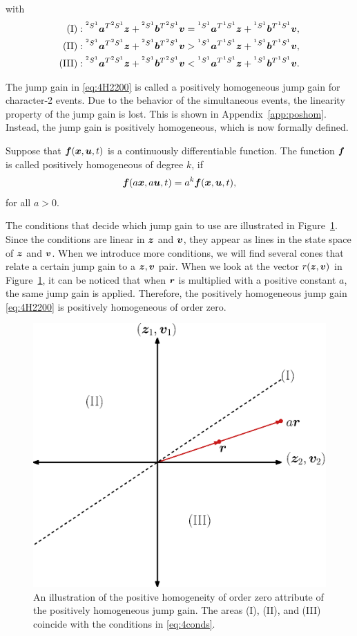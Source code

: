 \documentclass[../DC2017114Bouma.tex]{subfiles}
\begin{document}
with
\begin{align}
(\text{I})&:\hspace{0cm}^{^2 S^1}{\boldsymbol{a}}^T\hspace{0cm}^{^2 S^1}{\boldsymbol{z}} +\hspace{0cm}^{^2 S^1}{\boldsymbol{b}}^T\hspace{0cm}^{^2 S^1}{\boldsymbol{v}} = \hspace{0cm}^{^1 S^1}{\boldsymbol{a}}^T\hspace{0cm}^{^1 S^1}{\boldsymbol{z}} +\hspace{0cm}^{^1 S^1}{\boldsymbol{b}}^T\hspace{0cm}^{^1 S^1}{\boldsymbol{v}},\nonumber\\
(\text{II})&:\hspace{0cm}^{^2 S^1}{\boldsymbol{a}}^T\hspace{0cm}^{^2 S^1}{\boldsymbol{z}} +\hspace{0cm}^{^2 S^1}{\boldsymbol{b}}^T\hspace{0cm}^{^2 S^1}{\boldsymbol{v}} > \hspace{0cm}^{^1 S^1}{\boldsymbol{a}}^T\hspace{0cm}^{^1 S^1}{\boldsymbol{z}} +\hspace{0cm}^{^1 S^1}{\boldsymbol{b}}^T\hspace{0cm}^{^1 S^1}{\boldsymbol{v}},\label{eq:4conds}\\
(\text{III})&:\hspace{0cm}^{^2 S^1}{\boldsymbol{a}}^T\hspace{0cm}^{^2 S^1}{\boldsymbol{z}} +\hspace{0cm}^{^2 S^1}{\boldsymbol{b}}^T\hspace{0cm}^{^2 S^1}{\boldsymbol{v}} < \hspace{0cm}^{^1 S^1}{\boldsymbol{a}}^T\hspace{0cm}^{^1 S^1}{\boldsymbol{z}} +\hspace{0cm}^{^1 S^1}{\boldsymbol{b}}^T\hspace{0cm}^{^1 S^1}{\boldsymbol{v}}.\nonumber
\end{align}

The jump gain in \eqref{eq:4H2200} is called a positively homogeneous jump gain for character-2 events. Due to the behavior of the simultaneous events, the linearity property of the jump gain is lost. This is shown in Appendix~\ref{app:poshom}. Instead, the jump gain is positively homogeneous, which is now formally defined.
 
\begin{mydef}
Suppose that ${\boldsymbol{f}}({\boldsymbol{x}},{\boldsymbol{u}},t)$ is a continuously differentiable function. The function ${\boldsymbol{f}}$ is called positively homogeneous of degree $k$, if 
\begin{align}
{\boldsymbol{f}}(a{\boldsymbol{x}},a{\boldsymbol{u}},t) = a^k{\boldsymbol{f}}({\boldsymbol{x}},{\boldsymbol{u}},t),
\end{align}
for all $a>0$.
\end{mydef}

The conditions that decide which jump gain to use are illustrated in Figure~\ref{fig:4cone}. Since the conditions are linear in ${\boldsymbol{z}}$ and ${\boldsymbol{v}}$, they appear as lines in the state space of ${\boldsymbol{z}}$ and ${\boldsymbol{v}}$. When we introduce more conditions, we will find several cones that relate a certain jump gain to a ${\boldsymbol{z}},{\boldsymbol{v}}$ pair. When we look at the vector $r({\boldsymbol{z}},{\boldsymbol{v}})$ in Figure~\ref{fig:4cone}, it can be noticed that when ${\boldsymbol{r}}$ is multiplied with a positive constant $a$, the same jump gain is applied. Therefore, the positively homogeneous jump gain \eqref{eq:4H2200} is positively homogeneous of order zero.

\begin{figure}[H]
\centering
\includegraphics[width=.5\textwidth]{4cone.eps}\caption{An illustration of the positive homogeneity of order zero attribute of the positively homogeneous jump gain. The areas \textnormal{(I)}, \textnormal{(II)}, and \textnormal{(III)} coincide with the conditions in \eqref{eq:4conds}.}\label{fig:4cone}
\end{figure}
\end{document}
